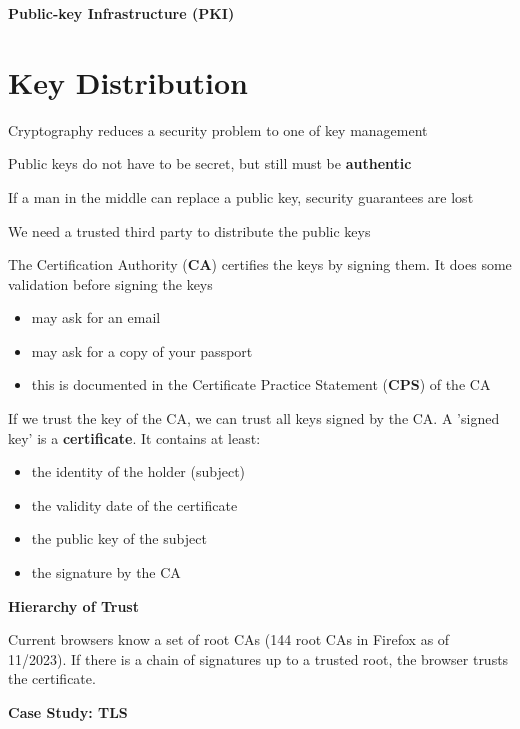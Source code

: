 \documentclass[11pt]{article}
\begin{document}
\newpage

\begin{center}
  {\LARGE \textbf{Public-key Infrastructure (PKI)}}
\end{center}

\vspace{1cm}

\section*{Key Distribution}

Cryptography reduces a security problem to one of key management

Public keys do not have to be secret, but still must be \textbf{authentic}

If a man in the middle can replace a public key, security guarantees are lost

We need a trusted third party to distribute the public keys

The Certification Authority (\textbf{CA}) certifies the keys by signing them. It does some validation before signing the keys

\begin{itemize}
	\item may ask for an email
	\item may ask for a copy of your passport
	\item this is documented in the Certificate Practice Statement (\textbf{CPS}) of the CA
\end{itemize}

If we trust the key of the CA, we can trust all keys signed by the CA. A 'signed key' is a \textbf{certificate}. It contains at least:
\begin{itemize}
	\item the identity of the holder (subject)
	\item the validity date of the certificate
	\item the public key of the subject
	\item the signature by the CA
\end{itemize}

\textbf{Hierarchy of Trust}

Current browsers know a set of root CAs (144 root CAs in Firefox as of 11/2023). If there is a chain of signatures up to a trusted root, the browser trusts the certificate. 

\vspace{0.5cm}

\begin{center}
  {\LARGE \textbf{Case Study: TLS}}
\end{center}
\end{document}
